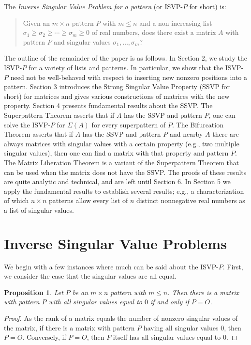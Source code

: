 \documentclass[preprint,12pt]{elsarticle}
\newtheorem{proposition}[theorem]{Proposition}
\begin{document}
The \textit{Inverse Singular Value Problem for a pattern} (or ISVP-$P$ for short)
is:
\begin{quote}
Given an $m \times n$ pattern $P$ with $m\leq n$ and a non-increasing list 
$\sigma_1\geq \sigma_2 \geq \cdots \geq \sigma_m\geq 0$ of real numbers, does there 
exist a matrix $A$ with pattern $P$ and  singular values $\sigma_1, \ldots, \sigma_m$?
\end{quote}                                                           
The outline of the remainder of the paper is as follows.
In Section 2, we study the ISVP-$P$ for a variety of lists and patterns. In particular, we show that the ISVP-$P$ need not be well-behaved with respect to inserting new nonzero positions into a pattern. Section 3 introduces the Strong Singular Value Property (SSVP for short) for matrices and gives various constructions of matrices 
with the new property. Section 4 presents fundamental results about the SSVP.  The Superpattern Theorem asserts that if $A$ has the SSVP  and pattern $P$, one can solve the ISVP-$P$ for $\Sigma(A)$ for every superpattern of $P$.  The Bifurcation Theorem  asserts that if $A$ has the SSVP and pattern $P$ and nearby $A$ there are always matrices with singular values with a certain property (e.g., two multiple singular values), then one can find a matrix with that property and pattern $P$. The Matrix Liberation Theorem is a  variant of the Superpattern Theorem that can be used when the matrix does not have the SSVP. The proofs of these results are quite analytic and technical, and are left until Section 6.  In Section 5
we apply the fundamental results to establish several results; e.g., 
a characterization of which $n\times n$ patterns allow every list of $n$ distinct nonnegative real numbers as a list of singular values. 



\section{Inverse Singular Value Problems}
We begin with a few instances where much can be said about the  ISVP-$P$.  First, we consider the case that the singular values are all equal. 
\begin{proposition}
Let $P$ be an $m \times n$ pattern with $m\leq n$.
Then there is a matrix with pattern $P$ with all singular values equal to $0$ if and only if $P=O$.
\end{proposition}
\begin{proof}
    As the rank of a matrix equals the number of nonzero singular values of the matrix, if there is a matrix with pattern $P$ having all singular values $0$, then $P=O$. 
    Conversely,  if $P=O$, then $P$ itself has all singular values equal to $0$. 
\end{proof}
\end{document}
